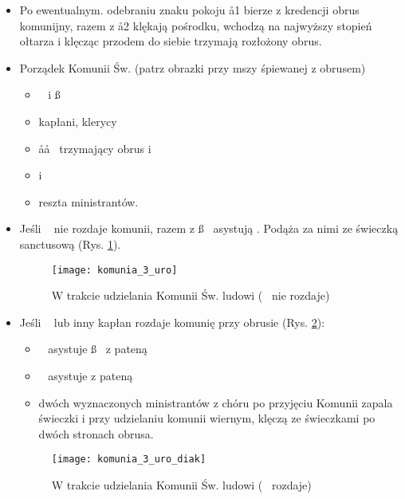 \begin{itemize}
	\item Po ewentualnym. odebraniu znaku pokoju \aa1 bierze z kredencji obrus
	      komunijny, razem z \aa2 klękają pośrodku, wchodzą na najwyższy stopień
	      ołtarza i klęcząc przodem do siebie trzymają rozłożony obrus.
	\item Porządek Komunii Św. (patrz obrazki przy mszy śpiewanej z obrusem)
	      \begin{itemize}
		      \item \dd~ i \ss~
		      \item kapłani, klerycy
		      \item \aa\aa~ trzymający obrus i 
		      \item {} i \tt~
		      \item reszta ministrantów.
	      \end{itemize}
	\item Jeśli \dd~ nie rozdaje komunii, razem z \ss~ asystują \ii. Podąża za
	      nimi  ze świeczką sanctusową (Rys. \ref{fig:komunia_3_uro}).

	      \begin{figure}[h]
		      \centering
		      \texttt{[image: komunia\_3\_uro]}
		      \caption{W trakcie udzielania Komunii Św. ludowi (\dd~ nie rozdaje)}
		      \label{fig:komunia_3_uro}
	      \end{figure}

	\item Jeśli \dd~ lub inny kapłan rozdaje komunię przy obrusie (Rys.
	      \ref{fig:komunia_3_uro_1}):

	      \begin{itemize}
		      \item \ii~ asystuje \ss~ z pateną
		      \item \dd~ asystuje  z pateną
		      \item dwóch wyznaczonych ministrantów z chóru po przyjęciu Komunii
		            zapala świeczki i przy udzielaniu komunii wiernym, klęczą ze
		            świeczkami po dwóch stronach obrusa.
	      \end{itemize}

	      \begin{figure}[ht]
		      \centering
		      \texttt{[image: komunia\_3\_uro\_diak]}
		      \caption{W trakcie udzielania Komunii Św. ludowi (\dd~ rozdaje)}
		      \label{fig:komunia_3_uro_1}
	      \end{figure}

\end{itemize}

\clearpage
